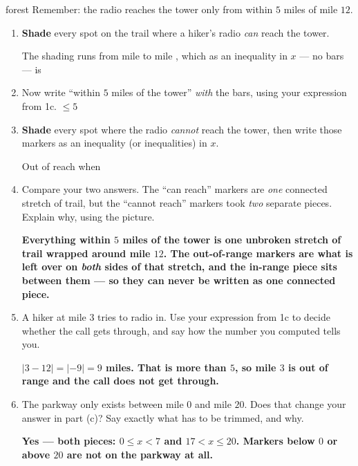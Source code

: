 \documentclass[12pt]{article}
\newcommand{\answerspace}[2]{\par\nopagebreak\noindent\begin{minipage}[t][#1][t]{\linewidth}%
  \color{keyred}\bfseries #2\end{minipage}\par}
\newcommand{\trail}{%
  \draw[->, semithick, charcoal] (-0.7,0)--(21.2,0) node[right, font=\scriptsize]{mile};
  \foreach \x in {0,...,20}{\draw[charcoal] (\x,0.26)--(\x,-0.26);}
  \foreach \x in {0,2,...,20}{\node[below, font=\scriptsize, charcoal] at (\x,-0.30){$\x$};}
  \fill[forest] (12,0) circle (3pt);
  \node[forest, font=\scriptsize, above] at (12,0.34){tower};}
\begin{document}
\boxguard[15]
\begin{scenariobox}{forest}
Remember: the radio reaches the tower only from within $5$ miles of mile $12$.

\begin{enumerate}[label=\textbf{\alph*.}, leftmargin=1.8em, itemsep=8pt]
  \item \textbf{Shade} every spot on the trail where a hiker's radio \emph{can} reach the tower.
    \begin{center}
    \end{center}
    The shading runs from mile  to mile , which as an inequality in $x$
    --- no bars --- is 
  \item Now write ``within $5$ miles of the tower'' \emph{with} the bars, using your expression from
        1c. \quad {} $\le 5$
  \item \textbf{Shade} every spot where the radio \emph{cannot} reach the tower, then write those
        markers as an inequality (or inequalities) in $x$.
    \begin{center}
    \end{center}
    Out of reach when 
  \item Compare your two answers. The ``can reach'' markers are \emph{one} connected stretch of
        trail, but the ``cannot reach'' markers took \emph{two} separate pieces. Explain why, using
        the picture.
    \answerspace{2.4cm}{Everything within $5$ miles of the tower is one unbroken stretch of trail wrapped around mile $12$. The out-of-range markers are what is left over on \emph{both} sides of that stretch, and the in-range piece sits between them --- so they can never be written as one connected piece.}
  \item A hiker at mile $3$ tries to radio in. Use your expression from 1c to decide whether the
        call gets through, and say how the number you computed tells you.
    \answerspace{2.0cm}{$|3-12| = |{-9}| = 9$ miles. That is more than $5$, so mile $3$ is out of range and the call does not get through.}
  \item The parkway only exists between mile $0$ and mile $20$. Does that change your answer in
        part (c)? Say exactly what has to be trimmed, and why.
    \answerspace{1.8cm}{Yes --- both pieces: $0 \le x < 7$ and $17 < x \le 20$. Markers below $0$ or above $20$ are not on the parkway at all.}
\end{enumerate}
\end{scenariobox}
\end{document}
